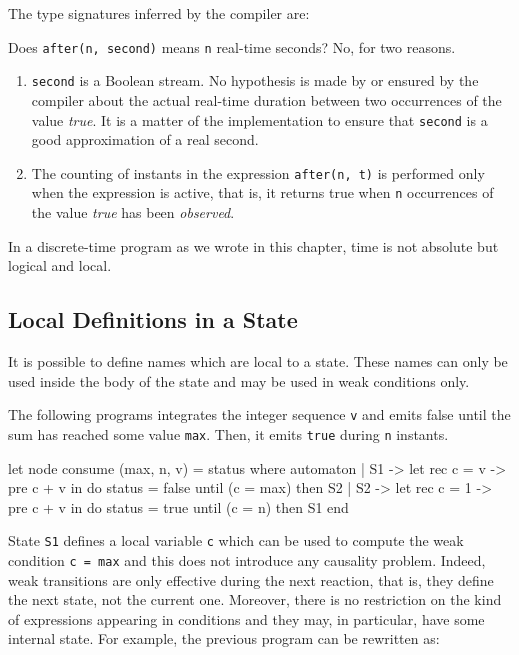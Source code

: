 \documentclass[11pt,titlepage,twoside]{report}
\begin{document}
\medskip
The type signatures inferred by the compiler are:
\runverbatimmsg{}

Does \texttt{after(n, second)} means \texttt{n} real-time seconds? No, for two reasons.
\begin{enumerate}
\item
  \texttt{second} is a Boolean stream. No hypothesis is made by or
  ensured by the compiler about the
  actual real-time duration between two occurrences of the value
  \emph{true}. It is a matter of the implementation to ensure that
  \texttt{second} is a good approximation of a real second.
\item
  The counting of instants in the expression
  \texttt{after(n, t)} is performed only when the expression is active, that is,
  it returns true when \texttt{n} occurrences of the value \emph{true} has
  been \emph{observed}.
\end{enumerate}
In a discrete-time program as we wrote in this chapter, time is not absolute but
logical and local.
  
\subsection{Local Definitions in a State}
It is possible to define names which are local to a state. These names
can only be used inside the body of the state and may be used in weak
conditions only.

The following programs integrates the integer sequence \verb-v- and
emits false until the sum has reached some value \verb-max-. Then, it
emits \verb-true- during \verb-n- instants.

\begin{runverbatim}
let node consume (max, n, v) = status where
  automaton
  | S1 ->
      let rec c = v -> pre c + v in
      do status = false
      until (c = max) then S2
  | S2 ->
      let rec c = 1 -> pre c + v in
      do status = true
      until (c = n) then S1
  end
\end{runverbatim}

State \verb-S1- defines a local variable \verb-c- which can be used to
compute the weak condition \verb-c = max- and this does not introduce
any causality problem. Indeed, weak transitions are only effective
during the next reaction, that is, they define the next state, not the
current one. Moreover, there is no restriction on the kind of
expressions appearing in conditions and they may, in particular, have
some internal state. For example, the previous program can be
rewritten as:
\end{document}
